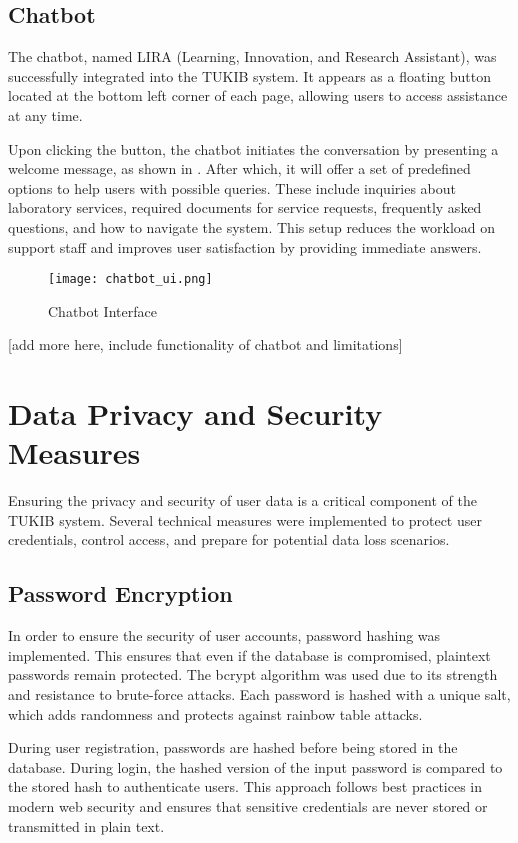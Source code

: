 \subsection{Chatbot}

The chatbot, named LIRA (Learning, Innovation, and Research Assistant), was successfully integrated into the TUKIB system. It appears as a floating button located at the bottom left corner of each page, allowing users to access assistance at any time.

Upon clicking the button, the chatbot initiates the conversation by presenting a welcome message, as shown in . After which, it will offer a set of predefined options to help users with possible queries. These include inquiries about laboratory services, required documents for service requests, frequently asked questions, and how to navigate the system. This setup reduces the workload on support staff and improves user satisfaction by providing immediate answers.

\begin{figure}[h]
	\centering
	\texttt{[image: chatbot\_ui.png]}
	\caption{Chatbot Interface}
	\label{fig:chatbot_ui}
\end{figure}

[add more here, include functionality of chatbot and limitations]

\section{Data Privacy and Security Measures}

Ensuring the privacy and security of user data is a critical component of the TUKIB system. Several technical measures were implemented to protect user credentials, control access, and prepare for potential data loss scenarios.

\subsection{Password Encryption}

In order to ensure the security of user accounts, password hashing was implemented. This ensures that even if the database is compromised, plaintext passwords remain protected. The bcrypt algorithm was used due to its strength and resistance to brute-force attacks. Each password is hashed with a unique salt, which adds randomness and protects against rainbow table attacks.

During user registration, passwords are hashed before being stored in the database. During login, the hashed version of the input password is compared to the stored hash to authenticate users. This approach follows best practices in modern web security and ensures that sensitive credentials are never stored or transmitted in plain text.

